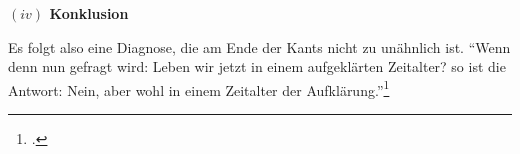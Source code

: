 \documentclass[a4paper, 12pt]{article}
\begin{document}
\begin{onehalfspace}
\vspace{5mm}
%
%
\noindent\textbf{$(iv)$ Konklusion}

\noindent Es folgt also eine Diagnose, die am Ende der Kants nicht zu unähnlich ist. "`Wenn denn nun gefragt wird: Leben wir jetzt in einem aufgeklärten Zeitalter? so ist die Antwort: Nein, aber wohl in einem Zeitalter der Aufklärung."'\footnote{\Cite[Siehe][S. 491]{kant}.}

\newpage

\end{onehalfspace}
\nocite{*}
\printbibliography
\end{document}
